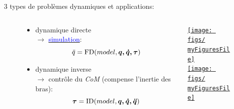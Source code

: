\documentclass[10pt]{beamer}
\begin{document}
\begin{frame}[allowframebreaks]
	3 types de problèmes dynamiques et applications:
	\begin{figure}[T]
	\begin{columns}[T]
	  \begin{column}{.48\textwidth}
		  \begin{itemize}
		  	\item dynamique directe \\
		  	      $\rightarrow$ \href{run:/home/nuno/Documents/Stage/Documents/Videos/14-ichr-metapod-v6-submitted.mp4}	{\textcolor{blue}{simulation}}:
						\begin{equation}
						\ddot{q} = \mathrm{FD}(model,\boldsymbol{q,\dot{q},\tau})
						\end{equation}
		  \item 	dynamique inverse \\
		        $\rightarrow$ contrôle du \emph{CoM} (compense l'inertie des bras):
						\begin{equation}
						\boldsymbol{\tau} = \mathrm{ID}(model,\boldsymbol{q,\dot{q},\ddot{q}})
						\end{equation}
			\end{itemize}
		\end{column}
		\begin{column}{.48\textwidth}
		  \begin{center}
		  \href{run:/home/nuno/Documents/Stage/Documents/Videos/14-ichr-metapod-v6-submitted.mp4}{\texttt{[image: figs/\\myFiguresFile]}} \\
		  \bigskip
			\href{run:/home/nuno/Documents/Stage/Documents/Videos/14-ichr-metapod-v6-submitted.mp4}{\texttt{[image: figs/\\myFiguresFile]}}
			\hfill
			\end{center}
		\end{column}
	\end{columns}
	\end{figure}
	
	\hyperlink{app_filDyn}{}
  
	\framebreak
	

\end{frame}
\end{document}
